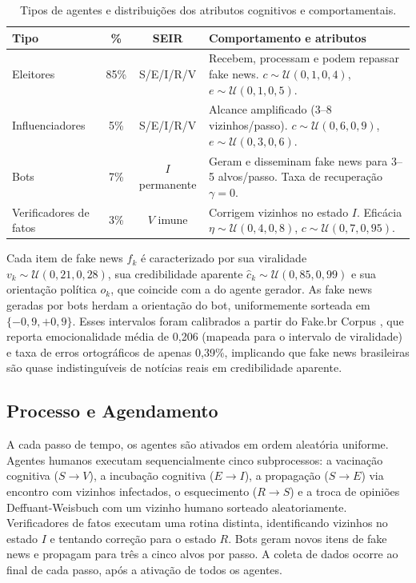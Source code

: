 \documentclass[12pt,a4paper]{article}
\theoremstyle{definition}
\theoremstyle{plain}
\begin{document}
\begin{table}[H]
\centering
\small
\begin{tabular}{p{2.8cm}ccp{6.0cm}}
\toprule
\textbf{Tipo} & \textbf{\%} & \textbf{SEIR} & \textbf{Comportamento e atributos} \\
\midrule
Eleitores & 85\% & S/E/I/R/V & Recebem, processam e podem repassar fake news. $c \sim \mathcal{U}(0{,}1, 0{,}4)$, $e \sim \mathcal{U}(0{,}1, 0{,}5)$. \\
\addlinespace
Influenciadores & 5\% & S/E/I/R/V & Alcance amplificado (3--8 vizinhos/passo). $c \sim \mathcal{U}(0{,}6, 0{,}9)$, $e \sim \mathcal{U}(0{,}3, 0{,}6)$. \\
\addlinespace
Bots & 7\% & $I$ permanente & Geram e disseminam fake news para 3--5 alvos/passo. Taxa de recuperação $\gamma = 0$. \\
\addlinespace
Verificadores de fatos & 3\% & $V$ imune & Corrigem vizinhos no estado $I$. Eficácia $\eta \sim \mathcal{U}(0{,}4, 0{,}8)$, $c \sim \mathcal{U}(0{,}7, 0{,}95)$. \\
\bottomrule
\end{tabular}
\caption{Tipos de agentes e distribuições dos atributos cognitivos e comportamentais.}
\label{tab:agents}
\end{table}

Cada item de fake news $f_k$ é caracterizado por sua viralidade $v_k \sim \mathcal{U}(0{,}21, 0{,}28)$, sua credibilidade aparente $\hat{c}_k \sim \mathcal{U}(0{,}85, 0{,}99)$ e sua orientação política $o_k$, que coincide com a do agente gerador. As fake news geradas por bots herdam a orientação do bot, uniformemente sorteada em $\{-0{,}9, +0{,}9\}$. Esses intervalos foram calibrados a partir do Fake.br Corpus \citep{monteiro2018fakebr}, que reporta emocionalidade média de 0,206 (mapeada para o intervalo de viralidade) e taxa de erros ortográficos de apenas 0,39\%, implicando que fake news brasileiras são quase indistinguíveis de notícias reais em credibilidade aparente.

\subsection{Processo e Agendamento}
\label{subsec:process}

A cada passo de tempo, os agentes são ativados em ordem aleatória uniforme. Agentes humanos executam sequencialmente cinco subprocessos: a vacinação cognitiva ($S \to V$), a incubação cognitiva ($E \to I$), a propagação ($S \to E$) via encontro com vizinhos infectados, o esquecimento ($R \to S$) e a troca de opiniões Deffuant-Weisbuch com um vizinho humano sorteado aleatoriamente. Verificadores de fatos executam uma rotina distinta, identificando vizinhos no estado $I$ e tentando correção para o estado $R$. Bots geram novos itens de fake news e propagam para três a cinco alvos por passo. A coleta de dados ocorre ao final de cada passo, após a ativação de todos os agentes.
\end{document}
